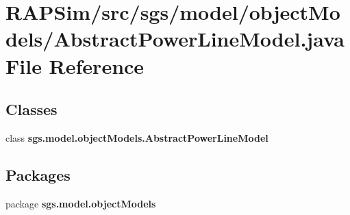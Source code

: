\section{R\-A\-P\-Sim/src/sgs/model/object\-Models/\-Abstract\-Power\-Line\-Model.java File Reference}
\label{_abstract_power_line_model_8java}
\subsection*{Classes}
\begin{DoxyCompactItemize}
\item 
class {\bf sgs.\-model.\-object\-Models.\-Abstract\-Power\-Line\-Model}
\end{DoxyCompactItemize}
\subsection*{Packages}
\begin{DoxyCompactItemize}
\item 
package {\bf sgs.\-model.\-object\-Models}
\end{DoxyCompactItemize}
